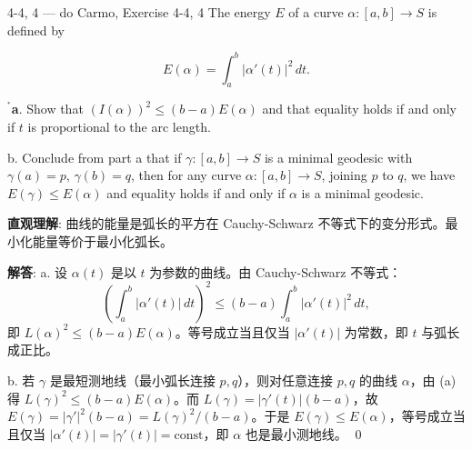 \begin{exercise}{4-4, 4 — do Carmo, Exercise 4-4, 4}
The energy $E$ of a curve $\alpha \colon [a, b] \to S$ is defined by

\[
E(\alpha) = \int_a^b |\alpha'(t)|^2 \, dt.
\]

$^{^*}$\textbf{a}. Show that $(I(\alpha))^2 \leq (b - a)E(\alpha)$ and that equality holds if and only if $t$ is proportional to the arc length.

b. Conclude from part a that if $\gamma \colon [a,b]\to S$ is a minimal geodesic with $\gamma(a) = p$, $\gamma(b) = q$, then for any curve $\alpha \colon [a,b]\to S$, joining $p$ to $q$, we have $E(\gamma) \leq E(\alpha)$ and equality holds if and only if $\alpha$ is a minimal geodesic.
\end{exercise}

\begin{solution}
\textbf{直观理解}: 曲线的能量是弧长的平方在 Cauchy-Schwarz 不等式下的变分形式。最小化能量等价于最小化弧长。

\textbf{解答}: a. 设 $\alpha(t)$ 是以 $t$ 为参数的曲线。由 Cauchy-Schwarz 不等式：
\[
\left(\int_a^b |\alpha'(t)|\,dt\right)^2 \leq (b-a)\int_a^b |\alpha'(t)|^2\,dt,
\]
即 $L(\alpha)^2 \leq (b-a)E(\alpha)$。等号成立当且仅当 $|\alpha'(t)|$ 为常数，即 $t$ 与弧长成正比。

b. 若 $\gamma$ 是最短测地线（最小弧长连接 $p,q$），则对任意连接 $p,q$ 的曲线 $\alpha$，由 (a) 得 $L(\gamma)^2 \leq (b-a)E(\alpha)$。而 $L(\gamma) = |\gamma'(t)|(b-a)$，故 $E(\gamma) = |\gamma'|^2(b-a) = L(\gamma)^2/(b-a)$。于是 $E(\gamma) \leq E(\alpha)$，等号成立当且仅当 $|\alpha'(t)| = |\gamma'(t)| = \mathrm{const}$，即 $\alpha$ 也是最小测地线。
\qed
\end{solution}

